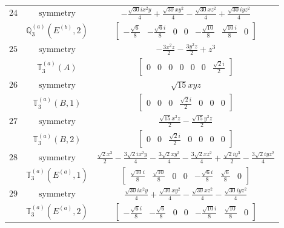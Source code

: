 \documentclass[fleqn,8pt,landscape]{jsarticle}
\begin{document}
\begin{longtable}{ccc}
$ 24 $ & $ \text{symmetry} $ & $ - \frac{\sqrt{30} i x^{2} y}{4} + \frac{\sqrt{30} x y^{2}}{4} - \frac{\sqrt{30} x z^{2}}{4} + \frac{\sqrt{30} i y z^{2}}{4} $ \\
$  $ & $ \mathbb{Q}_{3}^{(a)}(E^{(b)},2) $ & $ \begin{bmatrix} - \frac{\sqrt{6}}{8} & - \frac{\sqrt{6} i}{8} & 0 & 0 & - \frac{\sqrt{10}}{8} & \frac{\sqrt{10} i}{8} & 0 \end{bmatrix} $ \\ \hline
$ 25 $ & $ \text{symmetry} $ & $ - \frac{3 x^{2} z}{2} - \frac{3 y^{2} z}{2} + z^{3} $ \\
$  $ & $ \mathbb{T}_{3}^{(a)}(A) $ & $ \begin{bmatrix} 0 & 0 & 0 & 0 & 0 & 0 & \frac{\sqrt{2} i}{2} \end{bmatrix} $ \\ \hline
$ 26 $ & $ \text{symmetry} $ & $ \sqrt{15} x y z $ \\
$  $ & $ \mathbb{T}_{3}^{(a)}(B,1) $ & $ \begin{bmatrix} 0 & 0 & 0 & \frac{\sqrt{2} i}{2} & 0 & 0 & 0 \end{bmatrix} $ \\ \hline
$ 27 $ & $ \text{symmetry} $ & $ \frac{\sqrt{15} x^{2} z}{2} - \frac{\sqrt{15} y^{2} z}{2} $ \\
$  $ & $ \mathbb{T}_{3}^{(a)}(B,2) $ & $ \begin{bmatrix} 0 & 0 & \frac{\sqrt{2} i}{2} & 0 & 0 & 0 & 0 \end{bmatrix} $ \\ \hline
$ 28 $ & $ \text{symmetry} $ & $ \frac{\sqrt{2} x^{3}}{2} - \frac{3 \sqrt{2} i x^{2} y}{4} - \frac{3 \sqrt{2} x y^{2}}{4} - \frac{3 \sqrt{2} x z^{2}}{4} + \frac{\sqrt{2} i y^{3}}{2} - \frac{3 \sqrt{2} i y z^{2}}{4} $ \\
$  $ & $ \mathbb{T}_{3}^{(a)}(E^{(a)},1) $ & $ \begin{bmatrix} \frac{\sqrt{10} i}{8} & \frac{\sqrt{10}}{8} & 0 & 0 & - \frac{\sqrt{6} i}{8} & \frac{\sqrt{6}}{8} & 0 \end{bmatrix} $ \\ \hline
$ 29 $ & $ \text{symmetry} $ & $ \frac{\sqrt{30} i x^{2} y}{4} + \frac{\sqrt{30} x y^{2}}{4} - \frac{\sqrt{30} x z^{2}}{4} - \frac{\sqrt{30} i y z^{2}}{4} $ \\
$  $ & $ \mathbb{T}_{3}^{(a)}(E^{(a)},2) $ & $ \begin{bmatrix} - \frac{\sqrt{6} i}{8} & - \frac{\sqrt{6}}{8} & 0 & 0 & - \frac{\sqrt{10} i}{8} & \frac{\sqrt{10}}{8} & 0 \end{bmatrix} $ \\ \hline

\end{longtable}
\end{document}
